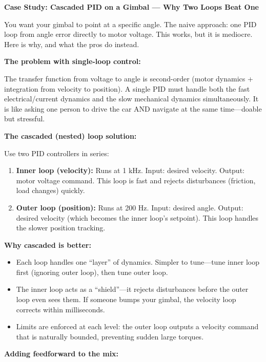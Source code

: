 \vspace{0.5em}
\begin{mdframed}[linewidth=1pt, innertopmargin=10pt, innerbottommargin=10pt]
\textbf{Case Study: Cascaded PID on a Gimbal --- Why Two Loops Beat One}

\vspace{0.3em}
You want your gimbal to point at a specific angle. The naive approach: one PID loop from angle error directly to motor voltage. This works, but it is mediocre. Here is why, and what the pros do instead.

\textbf{The problem with single-loop control:}

The transfer function from voltage to angle is second-order (motor dynamics + integration from velocity to position). A single PID must handle both the fast electrical/current dynamics and the slow mechanical dynamics simultaneously. It is like asking one person to drive the car AND navigate at the same time---doable but stressful.

\textbf{The cascaded (nested) loop solution:}

Use two PID controllers in series:
\begin{enumerate}[nosep]
    \item \textbf{Inner loop (velocity):} Runs at 1 kHz. Input: desired velocity. Output: motor voltage command. This loop is fast and rejects disturbances (friction, load changes) quickly.
    \item \textbf{Outer loop (position):} Runs at 200 Hz. Input: desired angle. Output: desired velocity (which becomes the inner loop's setpoint). This loop handles the slower position tracking.
\end{enumerate}

\textbf{Why cascaded is better:}
\begin{itemize}[nosep]
    \item Each loop handles one ``layer'' of dynamics. Simpler to tune---tune inner loop first (ignoring outer loop), then tune outer loop.
    \item The inner loop acts as a ``shield''---it rejects disturbances before the outer loop even sees them. If someone bumps your gimbal, the velocity loop corrects within milliseconds.
    \item Limits are enforced at each level: the outer loop outputs a velocity command that is naturally bounded, preventing sudden large torques.
\end{itemize}

\textbf{Adding feedforward to the mix:}


\end{mdframed}
